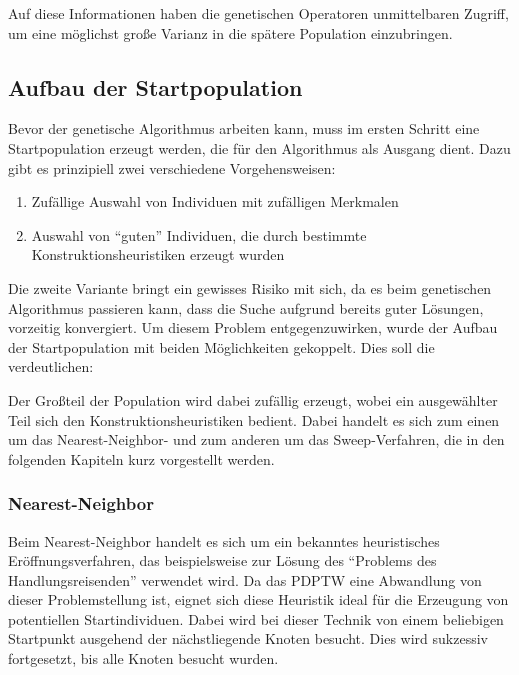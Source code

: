 
Auf diese Informationen haben die genetischen Operatoren unmittelbaren Zugriff, um eine möglichst große Varianz in die spätere Population einzubringen.

\subsection{Aufbau der Startpopulation}
\label{sec:Startposition}
Bevor der genetische Algorithmus arbeiten kann, muss im ersten Schritt eine Startpopulation erzeugt werden, die für den Algorithmus als Ausgang dient. Dazu gibt es prinzipiell zwei verschiedene Vorgehensweisen:

\begin{enumerate}
 \item Zufällige Auswahl von Individuen mit zufälligen Merkmalen
 \item Auswahl von "`guten"' Individuen, die durch bestimmte Konstruktionsheuristiken erzeugt wurden
\end{enumerate}

Die zweite Variante bringt ein gewisses Risiko mit sich, da es beim genetischen Algorithmus passieren kann, dass die Suche aufgrund bereits guter Lösungen, vorzeitig konvergiert. Um diesem Problem entgegenzuwirken, wurde der Aufbau der Startpopulation mit beiden Möglichkeiten gekoppelt. Dies soll die   verdeutlichen:


Der Großteil der Population wird dabei zufällig erzeugt, wobei ein ausgewählter Teil sich den Konstruktionsheuristiken bedient. Dabei handelt es sich zum einen um das Nearest-Neighbor- und zum anderen um das Sweep-Verfahren, die in den folgenden Kapiteln kurz vorgestellt werden.

\subsubsection{Nearest-Neighbor}
Beim Nearest-Neighbor handelt es sich um ein bekanntes heuristisches Eröffnungsverfahren, das beispielsweise zur Lösung des "`Problems des Handlungsreisenden"' verwendet wird. Da das PDPTW eine Abwandlung von dieser Problemstellung ist, eignet sich diese Heuristik ideal für die Erzeugung von potentiellen Startindividuen. Dabei wird bei dieser Technik von einem beliebigen Startpunkt ausgehend der nächstliegende Knoten besucht. Dies wird sukzessiv fortgesetzt, bis alle Knoten besucht wurden. 

